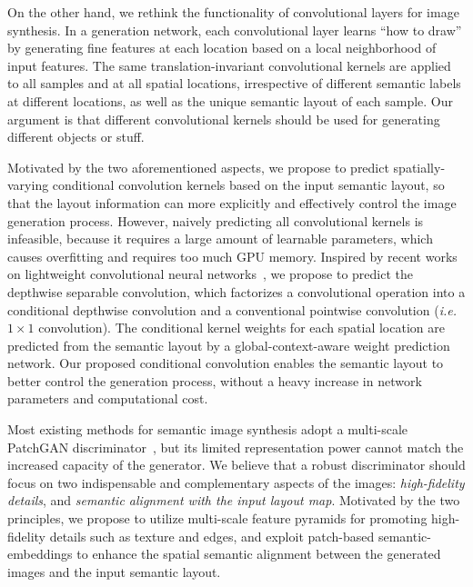 \documentclass{article}
\newcommand{\ie}{\textit{i.e.}}
\begin{document}
On the other hand, we rethink the functionality of convolutional layers for image synthesis. 
In a generation network, each convolutional layer learns ``how to draw'' by generating fine features at each location based on a local neighborhood of input features.
The same translation-invariant convolutional kernels are applied to all samples and at all spatial locations, irrespective of different semantic labels at different locations, as well as the unique semantic layout of each sample.
Our argument is that different convolutional kernels should be used for generating different objects or stuff.




Motivated by the two aforementioned aspects, we propose to predict spatially-varying conditional convolution kernels based on the input semantic layout, so that the layout information can more explicitly and effectively control the image generation process.
However, naively predicting all convolutional kernels is infeasible, because it requires a large amount of learnable parameters, which causes overfitting and requires too much GPU memory.
Inspired by recent works on lightweight convolutional neural networks~\cite{chollet2017xception,howard2017mobilenets,ma2018shufflenet}, we propose to predict the depthwise separable convolution, which factorizes a convolutional operation into a conditional depthwise convolution and a conventional pointwise convolution (\ie~$1\times1$ convolution). 
The conditional kernel weights for each spatial location are predicted from the semantic layout by a global-context-aware weight prediction network.
Our proposed conditional convolution enables the semantic layout to better control the generation process, without a heavy increase in network parameters and computational cost.


Most existing methods for semantic image synthesis adopt a multi-scale PatchGAN discriminator~\cite{wang2018high,park2019semantic}, but its limited representation power cannot match the increased capacity of the generator.
We believe that a robust discriminator should focus on two indispensable and complementary aspects of the images: \textit{high-fidelity details}, and \textit{semantic alignment with the input layout map}.
Motivated by the two principles, we propose to utilize multi-scale feature pyramids for promoting high-fidelity details such as texture and edges, and exploit patch-based semantic-embeddings to enhance the spatial semantic alignment between the generated images and the input semantic layout.
\end{document}
